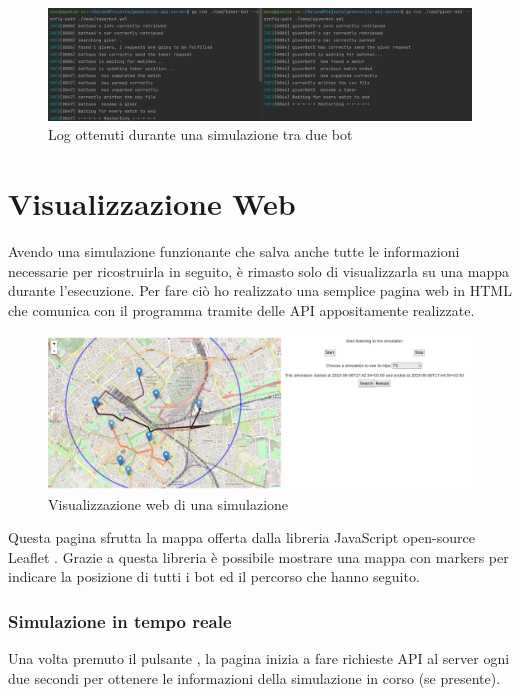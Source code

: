 \documentclass[main.tex]{subfiles}
\begin{document}
    \begin{figure}[H]
        \centering
        \includegraphics[width=1\linewidth]       {img/simulazione/logs.png}
        \caption{Log ottenuti durante una simulazione tra due bot}
        \label{fig:log}
    \end{figure}

\section{Visualizzazione Web}\label{visualizzazioneWeb}
Avendo una simulazione funzionante che salva anche tutte le informazioni necessarie per ricostruirla in seguito, è rimasto solo di visualizzarla su una mappa durante l'esecuzione. Per fare ciò ho realizzato una semplice pagina web in HTML che comunica con il programma tramite delle API appositamente realizzate. \newline

    \begin{figure}[H]
        \centering
        \includegraphics[width=1\linewidth]       {img/simulazione/web/oldSim.png}
        \caption{Visualizzazione web di una simulazione}
        \label{fig:oldSim}
    \end{figure}

Questa pagina sfrutta la mappa offerta dalla libreria JavaScript open-source Leaflet \cite{leafletjs}. Grazie a questa libreria è possibile mostrare una mappa con markers per indicare la posizione di tutti i bot ed il percorso che hanno seguito.

\subsubsection{Simulazione in tempo reale}
Una volta premuto il pulsante , la pagina inizia a fare richieste API al server ogni due secondi per ottenere le informazioni della simulazione in corso (se presente).
\end{document}
